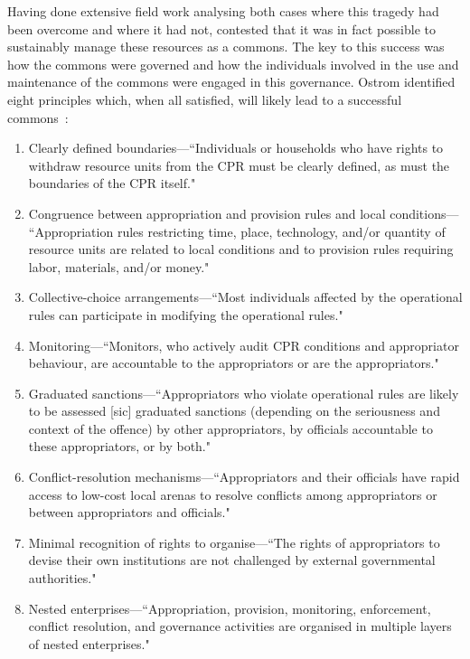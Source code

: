 Having done extensive field work analysing both cases where this tragedy had been overcome and where it had not, \citet{Ostrom1990} contested that it was in fact possible to sustainably manage these resources as a commons.
The key to this success was  how the commons were governed and how the individuals involved in the use and maintenance of the commons were engaged in this governance. 
Ostrom identified eight principles which, when all satisfied, will likely lead to a successful commons~\cite[pp.\ 91-101]{Ostrom1990}:
\begin{enumerate}
\item Clearly defined boundaries---``Individuals or households who have rights to withdraw resource units from the \ac{CPR} must be clearly defined, as must the boundaries of the \ac{CPR} itself."
\item Congruence between appropriation and provision rules and local conditions--- ``Appropriation rules restricting time, place, technology, and/or quantity of resource units are related to local conditions and to provision rules requiring labor, materials, and/or money."
\item Collective-choice arrangements---``Most individuals affected by the operational rules can participate in modifying the operational rules."
\item Monitoring---``Monitors, who actively audit \ac{CPR} conditions and appropriator behaviour, are accountable to the appropriators or are the appropriators."
\item Graduated sanctions---``Appropriators who violate operational rules are likely to be assessed [sic] graduated sanctions (depending on the seriousness and context of the offence) by other appropriators, by officials accountable to these appropriators, or by both."
\item Conflict-resolution mechanisms---``Appropriators and their officials have rapid access to low-cost local arenas to resolve conflicts among appropriators or between appropriators and officials."
\item Minimal recognition of rights to organise---``The rights of appropriators to devise their own institutions are not challenged by external governmental authorities."
\item Nested enterprises---``Appropriation, provision, monitoring, enforcement, conflict resolution, and governance activities are organised in multiple layers of nested enterprises."
\end{enumerate}

